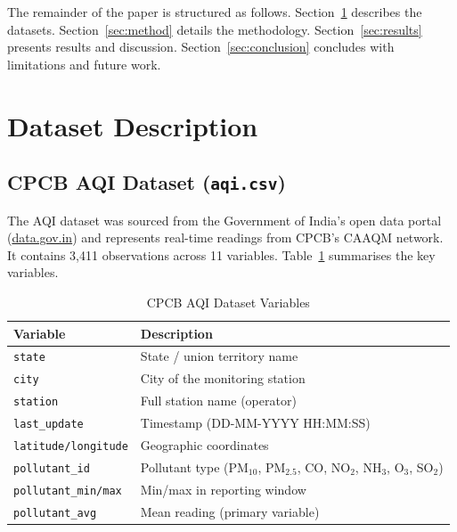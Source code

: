 \documentclass[10pt, conference]{IEEEtran}
\begin{document}
The remainder of the paper is structured as follows.
Section~\ref{sec:data} describes the datasets.
Section~\ref{sec:method} details the methodology.
Section~\ref{sec:results} presents results and discussion.
Section~\ref{sec:conclusion} concludes with limitations and
future work.

\section{Dataset Description}
\label{sec:data}

\subsection{CPCB AQI Dataset (\texttt{aqi.csv})}

The AQI dataset was sourced from the Government of India's
open data portal (\url{data.gov.in}) and represents
real-time readings from CPCB's CAAQM network.
It contains 3{,}411 observations across 11 variables.
Table~\ref{tab:aqi_vars} summarises the key variables.

\begin{table}[htbp]
  \centering
  \caption{CPCB AQI Dataset Variables}
  \label{tab:aqi_vars}
  \renewcommand{\arraystretch}{1.15}
  \begin{tabularx}{\linewidth}{@{}lX@{}}
    \toprule
    \textbf{Variable} & \textbf{Description} \\
    \midrule
    \texttt{state}         & State / union territory name \\
    \texttt{city}          & City of the monitoring station \\
    \texttt{station}       & Full station name (operator) \\
    \texttt{last\_update}  & Timestamp (DD-MM-YYYY HH:MM:SS) \\
    \texttt{latitude/longitude} & Geographic coordinates \\
    \texttt{pollutant\_id} & Pollutant type (PM$_{10}$, PM$_{2.5}$, CO, NO$_2$, NH$_3$, O$_3$, SO$_2$) \\
    \texttt{pollutant\_min/max} & Min/max in reporting window \\
    \texttt{pollutant\_avg} & Mean reading (primary variable) \\
    \bottomrule
  \end{tabularx}
\end{table}
\end{document}
